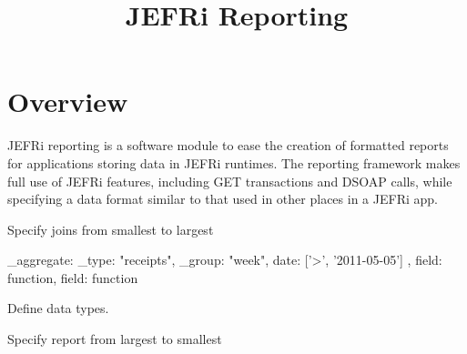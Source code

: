 \documentclass{article}
\begin{document}
\title{JEFRi Reporting}
\maketitle
\tableofcontents
\newpage
\linespread{1.6}

\section{Overview}
JEFRi reporting is a software module to ease the creation of formatted reports
for applications storing data in JEFRi runtimes. The reporting framework makes
full use of JEFRi features, including GET transactions and DSOAP calls, while
specifying a data format similar to that used in other places in a JEFRi app.

Specify joins from smallest to largest

{
	\_aggregate: {
		\_type: "receipts",
		\_group: "week",
		date: ['>', '2011-05-05']
	},
	field: function,
	field: function
}

Define data types.


Specify report from largest to smallest
\end{document}
